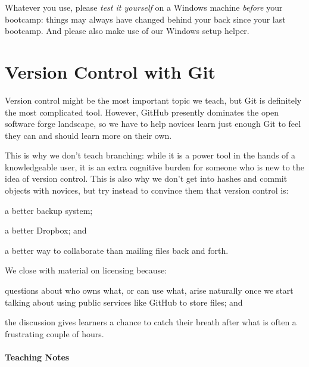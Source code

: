 \documentclass{book}
\begin{document}
Whatever you use, please \emph{test it yourself} on a Windows machine
\emph{before} your bootcamp: things may always have changed behind your
back since your last bootcamp. And please also make use of our Windows
setup helper.

\section{Version Control with Git}

Version control might be the most important topic we teach, but Git is
definitely the most complicated tool. However, GitHub presently
dominates the open software forge landscape, so we have to help novices
learn just enough Git to feel they can and should learn more on their
own.

This is why we don't teach branching: while it is a power tool in the
hands of a knowledgeable user, it is an extra cognitive burden for
someone who is new to the idea of version control. This is also why we
don't get into hashes and commit objects with novices, but try instead
to convince them that version control is:

\begin{swcenumerate}
\item
  a better backup system;
\item
  a better Dropbox; and
\item
  a better way to collaborate than mailing files back and forth.
\end{swcenumerate}

We close with material on licensing because:

\begin{swcenumerate}
\item
  questions about who owns what, or can use what, arise naturally once
  we start talking about using public services like GitHub to store
  files; and
\item
  the discussion gives learners a chance to catch their breath after
  what is often a frustrating couple of hours.
\end{swcenumerate}

\mbox{}\paragraph{Teaching Notes}
\end{document}
